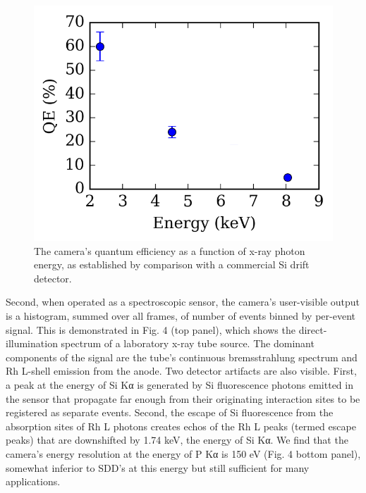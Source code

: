 \begin{figure}[h] \label{cmos25}
\caption{
The camera's quantum efficiency as a function of
x-ray photon energy, as established by comparison with a commercial Si
drift detector.
}
\centering
\includegraphics{NewCameraPaper_1.10.docx1502867018/media/image5.png}
\end{figure}


Second, when operated as a spectroscopic sensor, the camera's
user-visible output is a histogram, summed over all frames, of number of
events binned by per-event signal. This is demonstrated in Fig. 4 (top
panel), which shows the direct-illumination spectrum of a laboratory
x-ray tube source. The dominant components of the signal are the tube's
continuous bremsstrahlung spectrum and Rh L-shell emission from the
anode. Two detector artifacts are also visible. First, a peak at the
energy of Si Kα is generated by Si fluorescence photons emitted in the
sensor that propagate far enough from their originating interaction
sites to be registered as separate events. Second, the escape of Si
fluorescence from the absorption sites of Rh L photons creates echos of
the Rh L peaks (termed escape peaks) that are downshifted by 1.74 keV,
the energy of Si Kα. We find that the camera's energy resolution at the
energy of P Kα is 150 eV (Fig. 4 bottom panel), somewhat inferior to
SDD's at this energy but still sufficient for many applications.

\FloatBarrier

